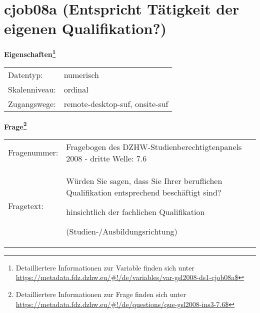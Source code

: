 
    \setcounter{footnote}{0}

    \vspace*{-1.8cm}
	\section{cjob08a (Entspricht Tätigkeit der eigenen Qualifikation?)}
	\label{section:cjob08a}



    \vspace*{0.5cm}
    \noindent\textbf{Eigenschaften\footnote{Detailliertere Informationen zur Variable finden sich unter
		\url{https://metadata.fdz.dzhw.eu/\#!/de/variables/var-gsl2008-ds1-cjob08a$}}}\\
	\begin{tabularx}{\hsize}{@{}lX}
	Datentyp: & numerisch \\
	Skalenniveau: & ordinal \\
	Zugangswege: &
	  remote-desktop-suf, 
	  onsite-suf
 \\
    \end{tabularx}



				\vspace*{0.5cm}
                \noindent\textbf{Frage\footnote{Detailliertere Informationen zur Frage finden sich unter
		              \url{https://metadata.fdz.dzhw.eu/\#!/de/questions/que-gsl2008-ins3-7.6$}}}\\
				\begin{tabularx}{\hsize}{@{}lX}
					Fragenummer: &
					  Fragebogen des DZHW-Studienberechtigtenpanels 2008 - dritte Welle:
					  7.6
 \\
					Fragetext: & Würden Sie sagen, dass Sie Ihrer beruflichen Qualifikation entsprechend beschäftigt sind?\par  hinsichtlich der fachlichen Qualifikation\par  (Studien-/Ausbildungsrichtung) \\
				\end{tabularx}






